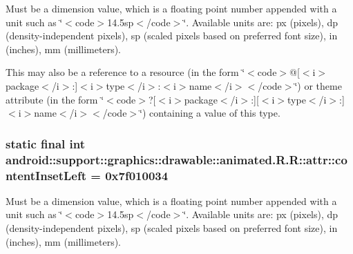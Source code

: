 Must be a dimension value, which is a floating point number appended with a unit such as \char`\"{}$<$code$>$14.5sp$<$/code$>$\char`\"{}. Available units are: px (pixels), dp (density-independent pixels), sp (scaled pixels based on preferred font size), in (inches), mm (millimeters). 

This may also be a reference to a resource (in the form \char`\"{}$<$code$>$@\mbox{[}$<$i$>$package$<$/i$>$:\mbox{]}$<$i$>$type$<$/i$>$:$<$i$>$name$<$/i$>$$<$/code$>$\char`\"{}) or theme attribute (in the form \char`\"{}$<$code$>$?\mbox{[}$<$i$>$package$<$/i$>$:\mbox{]}\mbox{[}$<$i$>$type$<$/i$>$:\mbox{]}$<$i$>$name$<$/i$>$$<$/code$>$\char`\"{}) containing a value of this type. \hypertarget{classandroid_1_1support_1_1graphics_1_1drawable_1_1animated_1_1_r_1_1attr_66b3970bc0c6b4a4e581de7984394271}{
\subsubsection[{contentInsetLeft}]{\setlength{\rightskip}{0pt plus 5cm}static final int android::support::graphics::drawable::animated.R.R::attr::contentInsetLeft = 0x7f010034}}
\label{classandroid_1_1support_1_1graphics_1_1drawable_1_1animated_1_1_r_1_1attr_66b3970bc0c6b4a4e581de7984394271}


Must be a dimension value, which is a floating point number appended with a unit such as \char`\"{}$<$code$>$14.5sp$<$/code$>$\char`\"{}. Available units are: px (pixels), dp (density-independent pixels), sp (scaled pixels based on preferred font size), in (inches), mm (millimeters). 

